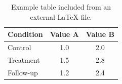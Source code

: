 \begin{table}[ht]
\centering
\caption{Example table included from an external LaTeX file.}
\label{tab:main}
\begin{tabular}{lcc}
\hline
Condition & Value A & Value B \\
\hline
Control & 1.0 & 2.0 \\
Treatment & 1.5 & 2.8 \\
Follow-up & 1.2 & 2.4 \\
\hline
\end{tabular}
\end{table}